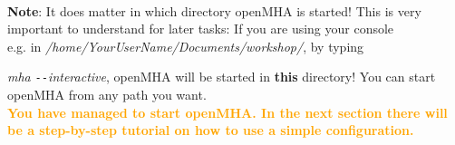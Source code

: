 \documentclass[11pt,a4paper,twoside]{article}
\newcommand{\+}{\discretionary{\mbox{\scriptsize$\hookleftarrow$}}{}{}}
\begin{document}
{{\dotfill \\

\large{\textbf{Note}}: It does matter in which directory openMHA is started! This is very important to understand for later tasks: If you are using your console \\ e.g. in \textit{/home/YourUserName/Documents/workshop/}, by typing {{\ttfamily \textit{mha \texttt{-{}-}interactive}}, openMHA will be started in \textbf{this} directory! You can start openMHA from any path you want. \\


\textcolor{orange}{\textbf{You have managed to start openMHA. In the next section there will be a step-by-step tutorial on how to use a simple configuration.}}

\vspace{1cm}





\newpage
}}}
\end{document}
